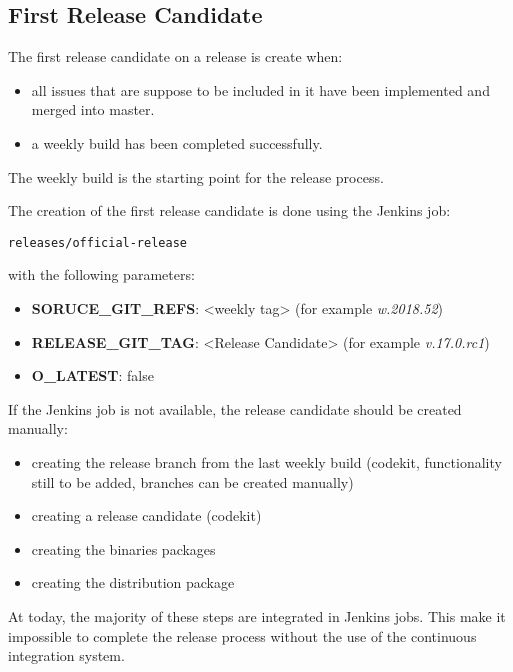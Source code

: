 \subsection{First Release Candidate} \label{sect:firstrc}

The first release candidate on a release is create when:

\begin{itemize}
\item all issues that are suppose to be included in it have been implemented and merged into master.
\item a weekly build has been completed successfully.
\end{itemize}

The weekly build is the starting point for the release process.

The creation of the first release candidate is done using the Jenkins job:

\begin{verbatim}
releases/official-release 
\end{verbatim}

with the following parameters:

\begin{itemize}
\item {\bf SORUCE\_GIT\_REFS}: <weekly tag> (for example \textit{w.2018.52})
\item {\bf RELEASE\_GIT\_TAG}: <Release Candidate> (for example \textit{v.17.0.rc1})
\item {\bf O\_LATEST}: false
\end{itemize}


If the Jenkins job is not available, the release candidate should be created manually:

\begin{itemize}
\item creating the release branch from the last weekly build (codekit, functionality still to be added, branches can be created manually)
\item creating a release candidate (codekit)
\item creating the binaries packages 
\item creating the distribution package
\end{itemize}

At today, the majority of these steps are integrated in Jenkins jobs. This make it impossible to complete the release process without the use of the continuous integration system.


